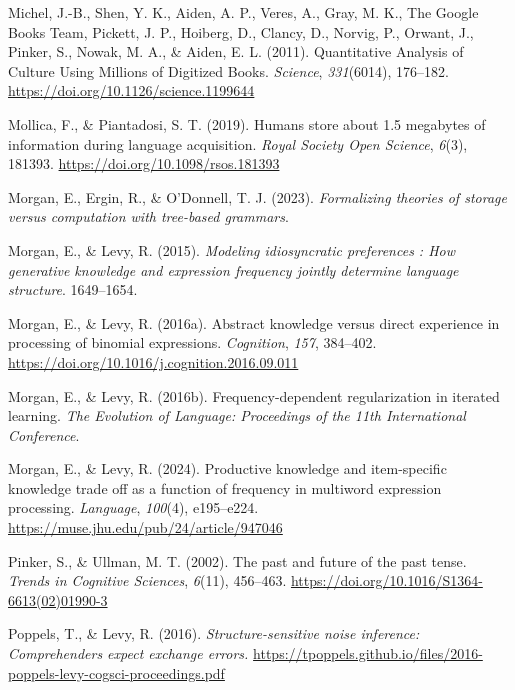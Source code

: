 \documentclass[
  12pt,
]{scrartcl}
\newlength{\cslhangindent}
\newenvironment{CSLReferences}[2] %
 {\begin{list}{}{%
  \setlength{\itemindent}{0pt}
  \setlength{\leftmargin}{0pt}
  \setlength{\parsep}{0pt}
  \ifodd #1
   \setlength{\leftmargin}{\cslhangindent}
   \setlength{\itemindent}{-1\cslhangindent}
  \fi
  \setlength{\itemsep}{#2\baselineskip}}}
 {\end{list}}
\begin{document}
\begin{CSLReferences}{1}{0}
Michel, J.-B., Shen, Y. K., Aiden, A. P., Veres, A., Gray, M. K., The
Google Books Team, Pickett, J. P., Hoiberg, D., Clancy, D., Norvig, P.,
Orwant, J., Pinker, S., Nowak, M. A., \& Aiden, E. L. (2011).
Quantitative Analysis of Culture Using Millions of Digitized Books.
\emph{Science}, \emph{331}(6014), 176--182.
\url{https://doi.org/10.1126/science.1199644}

Mollica, F., \& Piantadosi, S. T. (2019). Humans store about 1.5
megabytes of information during language acquisition. \emph{Royal
Society Open Science}, \emph{6}(3), 181393.
\url{https://doi.org/10.1098/rsos.181393}

Morgan, E., Ergin, R., \& O'Donnell, T. J. (2023). \emph{Formalizing
theories of storage versus computation with tree-based grammars}.

Morgan, E., \& Levy, R. (2015). \emph{Modeling idiosyncratic preferences
: How generative knowledge and expression frequency jointly determine
language structure}. 1649--1654.

Morgan, E., \& Levy, R. (2016a). Abstract knowledge versus direct
experience in processing of binomial expressions. \emph{Cognition},
\emph{157}, 384--402.
\url{https://doi.org/10.1016/j.cognition.2016.09.011}

Morgan, E., \& Levy, R. (2016b). Frequency-dependent regularization in
iterated learning. \emph{The Evolution of Language: Proceedings of the
11th International Conference}.

Morgan, E., \& Levy, R. (2024). Productive knowledge and item-specific
knowledge trade off as a function of frequency in multiword expression
processing. \emph{Language}, \emph{100}(4), e195--e224.
\url{https://muse.jhu.edu/pub/24/article/947046}

Pinker, S., \& Ullman, M. T. (2002). The past and future of the past
tense. \emph{Trends in Cognitive Sciences}, \emph{6}(11), 456--463.
\url{https://doi.org/10.1016/S1364-6613(02)01990-3}

Poppels, T., \& Levy, R. (2016). \emph{Structure-sensitive noise
inference: Comprehenders expect exchange errors.}
\url{https://tpoppels.github.io/files/2016-poppels-levy-cogsci-proceedings.pdf}


\end{CSLReferences}
\end{document}
